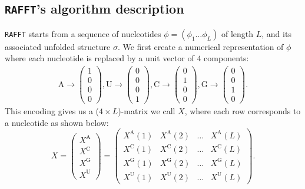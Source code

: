 \subsection{\texttt{RAFFT}'s  algorithm description}
\texttt{RAFFT} starts from a sequence of nucleotides \(\phi=(\phi_1\dots \phi_L)\) of length \(L\), and its associated unfolded structure $\sigma$. We first create a numerical representation of \(\phi\) where each nucleotide is replaced by a unit vector of $4$ components:
\begin{equation}
\begin{split}
\text{A} \rightarrow \begin{pmatrix} 1\\ 0\\ 0\\ 0 \end{pmatrix},
\text{U} \rightarrow \begin{pmatrix} 0\\ 0\\ 0\\ 1 \end{pmatrix},
\text{C} \rightarrow \begin{pmatrix} 0\\ 1\\ 0\\ 0 \end{pmatrix},
\text{G} \rightarrow \begin{pmatrix} 0\\ 0\\ 1\\ 0 \end{pmatrix}.
\end{split}
\end{equation}
This encoding gives us a (\(4 \times L\))-matrix we call \(X\), where each row corresponds to a nucleotide as shown below:
\begin{equation}
X = \begin{pmatrix} X^{\text{A}}\\ X^{\text{C}}\\ X^{\text{G}}\\ X^{\text{U}} \end{pmatrix} = \begin{pmatrix} X^{\text{A}}(1) &X^{\text{A}}(2) &\dots &X^{\text{A}}(L) \\ X^{\text{C}}(1) &X^{\text{C}}(2) &\dots &X^{\text{C}}(L)\\ X^{\text{G}}(1) &X^{\text{G}}(2) &\dots &X^{\text{G}}(L)\\ X^{\text{U}}(1) &X^{\text{U}}(2) &\dots &X^{\text{U}}(L) \end{pmatrix}.
\end{equation}
